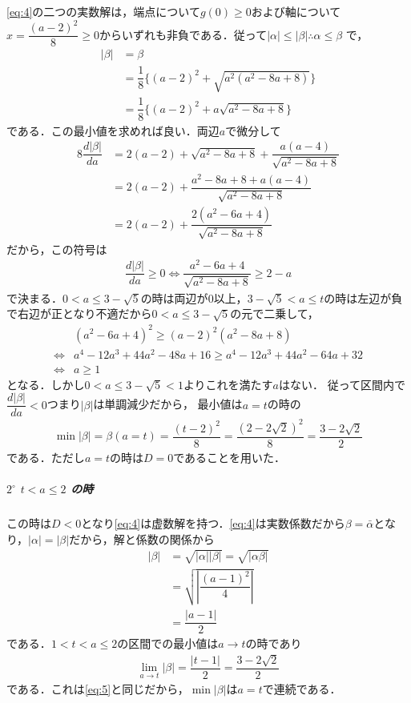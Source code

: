 \documentclass[../../main.tex]{subfiles}
\begin{document}
\cref{eq:4}の二つの実数解は，端点について$g(0) \ge 0$および軸について$x = \dfrac{(a-2)^2}{8} \ge 0$からいずれも非負である．従って$|\alpha| \le |\beta| \therefore \alpha \le \beta$ で，
\begin{align}
  |\beta|
  & = \beta \\
  & = \dfrac{1}{8}\{(a-2)^2 + \sqrt{a^2(a^2-8a+8)}\} \\
  & = \dfrac{1}{8}\{(a-2)^2 + a\sqrt{a^2-8a+8}\}
\end{align}
である．この最小値を求めれば良い．両辺$a$で微分して
\begin{align}
  8\dfrac{d|\beta|}{da}
  &= 2(a-2) + \sqrt{a^2-8a+8} + \dfrac{a(a-4)}{\sqrt{a^2-8a+8}} \\
  &= 2(a-2) + \dfrac{a^2-8a+8 + a(a-4)}{\sqrt{a^2-8a+8}} \\
  &= 2(a-2) + \dfrac{2(a^2-6a+4)}{\sqrt{a^2-8a+8}}
\end{align}
だから，この符号は
\begin{align}
  \dfrac{d|\beta|}{da} \ge 0
  \iff
  \dfrac{a^2-6a+4}{\sqrt{a^2-8a+8}} \ge 2-a
\end{align}
で決まる．$0<a\le 3-\sqrt{5}$の時は両辺が$0$以上，$3-\sqrt{5} < a \le t$の時は左辺が負で右辺が正となり不適だから$0<a \le 3-\sqrt{5}$の元で二乗して，
\begin{align}
  & (a^2-6a+4)^2 \ge (a-2)^2(a^2-8a+8) \\
  \iff
  & a^4-12a^3+44a^2-48a+16 \ge a^4-12a^3+44a^2-64a+32 \\
  \iff
  & a \ge 1
\end{align}
となる．しかし$0<a\le 3-\sqrt{5} < 1$よりこれを満たす$a$はない．
従って区間内で$\dfrac{d|\beta|}{da} < 0$つまり$|\beta|$は単調減少だから，
最小値は$a = t$の時の
\begin{align}
  \min |\beta| = \beta(a=t) = \dfrac{(t-2)^2}{8} = \dfrac{(2-2\sqrt{2})^2}{8} = \dfrac{3-2\sqrt{2}}{2} \label{eq:5}
\end{align}
である．ただし$a=t$の時は$D=0$であることを用いた．

\subparagraph{$2^\circ$ $t < a \le 2$ の時}

この時は$D<0$となり\cref{eq:4}は虚数解を持つ．\cref{eq:4}は実数係数だから$\beta=\bar{\alpha}$となり，$|\alpha|=|\beta|$だから，解と係数の関係から
\begin{align}
  |\beta|
  & = \sqrt{|\alpha||\beta|}
  = \sqrt{|\alpha\beta|} \\
  & = \sqrt{\left|\dfrac{(a-1)^2}{4}\right|} \\
  & = \dfrac{|a-1|}{2}
\end{align}
である．$1<t<a\le2$の区間での最小値は$a\to t$の時であり
\begin{align}
  \lim_{a\to t}|\beta| = \dfrac{|t-1|}{2} = \dfrac{3-2\sqrt{2}}{2}
\end{align}
である．これは\cref{eq:5}と同じだから，$\min |\beta|$は$a=t$で連続である．
\casesend
\end{document}
